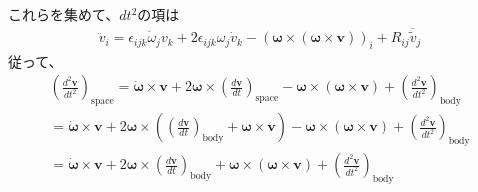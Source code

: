 \documentclass{jarticle}
\begin{document}
これらを集めて、$dt^2$の項は
\begin{eqnarray*}
\ddot{v}_i = \epsilon_{ijk}\dot{\omega}_j v_k + 2\epsilon_{ijk}\omega_j \dot{v}_k - (\mathbf{\omega} \times (\mathbf{\omega} \times \mathbf{v}))_i
+R_{ij}\ddot{\tilde{v}_j}
\end{eqnarray*}
従って、
\begin{eqnarray*}
\left(\frac{d^2\mathbf{v}}{dt^2}\right)_{\mbox{space}}
=\dot{\mathbf{\omega}}\times\mathbf{v} + 2 \mathbf{\omega} \times \left(\frac{d\mathbf{v}}{dt}\right)_{\mbox{space}} - \mathbf{\omega} \times (\mathbf{\omega} \times \mathbf{v}) +\left(\frac{d^2\mathbf{v}}{dt^2}\right)_{\mbox{body}} \\
=\dot{\mathbf{\omega}}\times\mathbf{v} + 2 \mathbf{\omega} \times (\left(\frac{d\mathbf{v}}{dt}\right)_{\mbox{body}}+\mathbf{\omega}\times\mathbf{v}) - \mathbf{\omega} \times (\mathbf{\omega} \times \mathbf{v}) +\left(\frac{d^2\mathbf{v}}{dt^2}\right)_{\mbox{body}}\\
=\dot{\mathbf{\omega}}\times\mathbf{v} + 2 \mathbf{\omega} \times \left(\frac{d\mathbf{v}}{dt}\right)_{\mbox{body}} + \mathbf{\omega} \times (\mathbf{\omega} \times \mathbf{v}) +\left(\frac{d^2\mathbf{v}}{dt^2}\right)_{\mbox{body}}
\end{eqnarray*}
\end{document}
